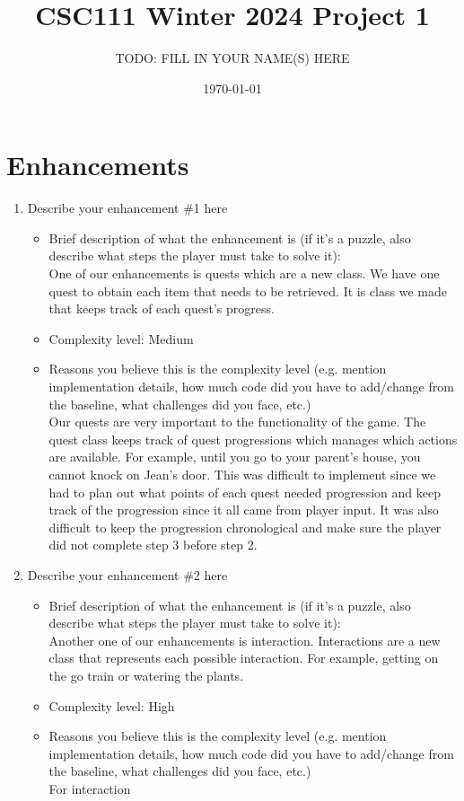 \documentclass[11pt]{article}
\title{CSC111 Winter 2024 Project 1}
\author{TODO: FILL IN YOUR NAME(S) HERE}
\date{\today}
\begin{document}
\maketitle

\section*{Enhancements}


\begin{enumerate}

\item Describe your enhancement \#1 here
	\begin{itemize}
	\item Brief description of what the enhancement is (if it's a puzzle, also describe what steps the player must take to solve it):
 \\One of our enhancements is quests which are a new class. We have one quest to obtain each item that needs to be retrieved. It is class we made that keeps track of each quest's progress.
	\item Complexity level: Medium
	\item Reasons you believe this is the complexity level (e.g. mention implementation details, how much code did you have to add/change from the baseline, what challenges did you face, etc.)
 \\Our quests are very important to the functionality of the game. The quest class keeps track of quest progressions which manages which actions are available. For example, until you go to your parent's house, you cannot knock on Jean's door. This was difficult to implement since we had to plan out what points of each quest needed progression and keep track of the progression since it all came from player input. It was also difficult to keep the progression chronological and make sure the player did not complete step 3 before step 2. 
	\end{itemize}

\item Describe your enhancement \#2 here
	\begin{itemize}
	\item Brief description of what the enhancement is (if it's a puzzle, also describe what steps the player must take to solve it):
 \\Another one of our enhancements is interaction. Interactions are a new class that represents each possible interaction. For example, getting on the go train or watering the plants.  
	\item Complexity level: High
	\item Reasons you believe this is the complexity level (e.g. mention implementation details, how much code did you have to add/change from the baseline, what challenges did you face, etc.)
 \\For interaction


\end{itemize}
\end{enumerate}
\end{document}
